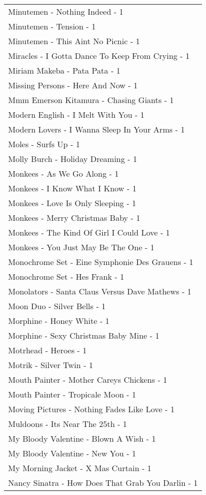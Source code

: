 \documentclass[
]{article}
\begin{document}
\begin{longtable}{l}
Minutemen - Nothing Indeed - 1 \\ 
Minutemen - Tension - 1 \\ 
Minutemen - This Aint No Picnic - 1 \\ 
Miracles - I Gotta Dance To Keep From Crying - 1 \\ 
Miriam Makeba - Pata Pata - 1 \\ 
Missing Persons - Here And Now - 1 \\ 
Mmm Emerson Kitamura - Chasing Giants - 1 \\ 
Modern English - I Melt With You - 1 \\ 
Modern Lovers - I Wanna Sleep In Your Arms - 1 \\ 
Moles - Surfs Up - 1 \\ 
Molly Burch - Holiday Dreaming - 1 \\ 
Monkees - As We Go Along - 1 \\ 
Monkees - I Know What I Know - 1 \\ 
Monkees - Love Is Only Sleeping - 1 \\ 
Monkees - Merry Christmas Baby - 1 \\ 
Monkees - The Kind Of Girl I Could Love - 1 \\ 
Monkees - You Just May Be The One - 1 \\ 
Monochrome Set - Eine Symphonie Des Grauens - 1 \\ 
Monochrome Set - Hes Frank - 1 \\ 
Monolators - Santa Claus Versus Dave Mathews - 1 \\ 
Moon Duo - Silver Bells - 1 \\ 
Morphine - Honey White - 1 \\ 
Morphine - Sexy Christmas Baby Mine - 1 \\ 
Motrhead - Heroes - 1 \\ 
Motrik - Silver Twin - 1 \\ 
Mouth Painter - Mother Careys Chickens - 1 \\ 
Mouth Painter - Tropicale Moon - 1 \\ 
Moving Pictures - Nothing Fades Like Love - 1 \\ 
Muldoons - Its Near The 25th - 1 \\ 
My Bloody Valentine - Blown A Wish - 1 \\ 
My Bloody Valentine - New You - 1 \\ 
My Morning Jacket - X Mas Curtain - 1 \\ 
Nancy Sinatra - How Does That Grab You Darlin - 1 \\ 

\end{longtable}
\end{document}
